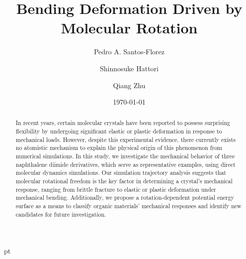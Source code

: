 \documentclass[prb,superscriptaddress,longbibliography, twocolumn]{revtex4-1}
\begin{document}
\title{Bending Deformation Driven by Molecular Rotation}

\author{Pedro A. Santos-Florez}

\author{Shinnosuke Hattori}

\author{Qiang Zhu}

\date{\today}

\begin{abstract}
In recent years, certain molecular crystals have been reported to possess surprising flexibility by undergoing significant elastic or plastic deformation in response to mechanical loads. However, despite this experimental evidence, there currently exists no atomistic mechanism to explain the physical origin of this phenomenon from numerical simulations. In this study, we investigate the mechanical behavior of three naphthalene diimide derivatives, which serve as representative examples, using direct molecular dynamics simulations. Our simulation trajectory analysis suggests that molecular rotational freedom is the key factor in determining a crystal's mechanical response, ranging from brittle fracture to elastic or plastic deformation under mechanical bending. Additionally, we propose a rotation-dependent potential energy surface as a means to classify organic materials' mechanical responses and identify new candidates for future investigation.
\end{abstract}


 pt

\maketitle
\end{document}
